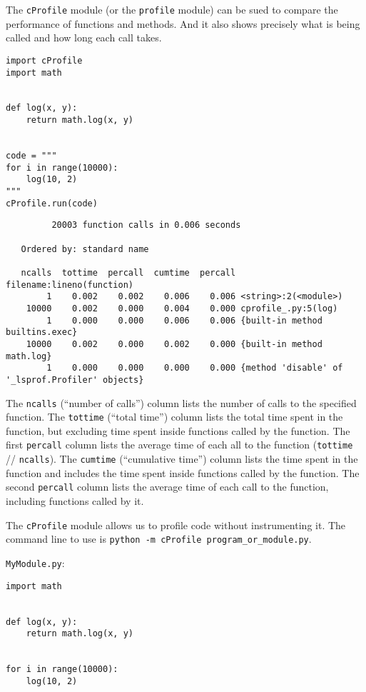 The \verb|cProfile| module (or the \verb|profile| module) can be sued to compare the performance of functions and methods.
And it also shows precisely what is being called and how long each call takes.


\begin{lstlisting}
import cProfile
import math


def log(x, y):
    return math.log(x, y)


code = """
for i in range(10000):
    log(10, 2)
"""
cProfile.run(code)
\end{lstlisting}


\begin{verbatim}
         20003 function calls in 0.006 seconds

   Ordered by: standard name

   ncalls  tottime  percall  cumtime  percall filename:lineno(function)
        1    0.002    0.002    0.006    0.006 <string>:2(<module>)
    10000    0.002    0.000    0.004    0.000 cprofile_.py:5(log)
        1    0.000    0.000    0.006    0.006 {built-in method builtins.exec}
    10000    0.002    0.000    0.002    0.000 {built-in method math.log}
        1    0.000    0.000    0.000    0.000 {method 'disable' of '_lsprof.Profiler' objects}
\end{verbatim}

The \verb|ncalls| (``number of calls'') column lists the number of calls to the specified function.
The \verb|tottime| (``total time'') column lists the total time spent in the function, but excluding time spent inside functions called by the function.
The first \verb|percall| column lists the average time of each all to the function (\verb|tottime| // \verb|ncalls|).
The \verb|cumtime| (``cumulative time'') column lists the time spent in the function and includes the time spent inside functions called by the function.
The second \verb|percall| column lists the average time of each call to the function, including functions called by it.




The \verb|cProfile| module allows us to profile code without instrumenting it.
The command line to use is \verb|python -m cProfile program_or_module.py|.

\verb|MyModule.py|:
\begin{lstlisting}
import math


def log(x, y):
    return math.log(x, y)


for i in range(10000):
    log(10, 2)
  
\end{lstlisting}

